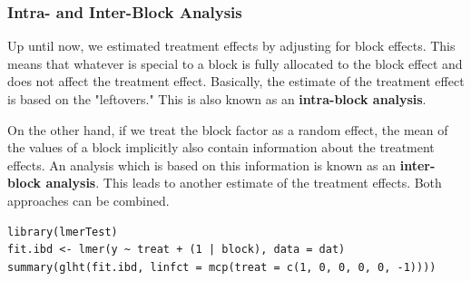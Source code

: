\subsubsection{Intra- and Inter-Block Analysis}

Up until now, we estimated treatment effects by adjusting for block effects. This means that whatever is special to a block is fully allocated to the block effect and does not affect the treatment effect. Basically, the estimate of the treatment effect is based on the "leftovers." This is also known as an \textbf{intra-block analysis}. \medskip

On the other hand, if we treat the block factor as a random effect, the mean of the values of a block implicitly also contain information about the treatment effects. An analysis which is based on this information is known as an \textbf{inter-block analysis}. This leads to another estimate of the treatment effects. Both approaches can be combined. 

\begin{lstlisting}
library(lmerTest)
fit.ibd <- lmer(y ~ treat + (1 | block), data = dat)
summary(glht(fit.ibd, linfct = mcp(treat = c(1, 0, 0, 0, 0, -1))))
\end{lstlisting}